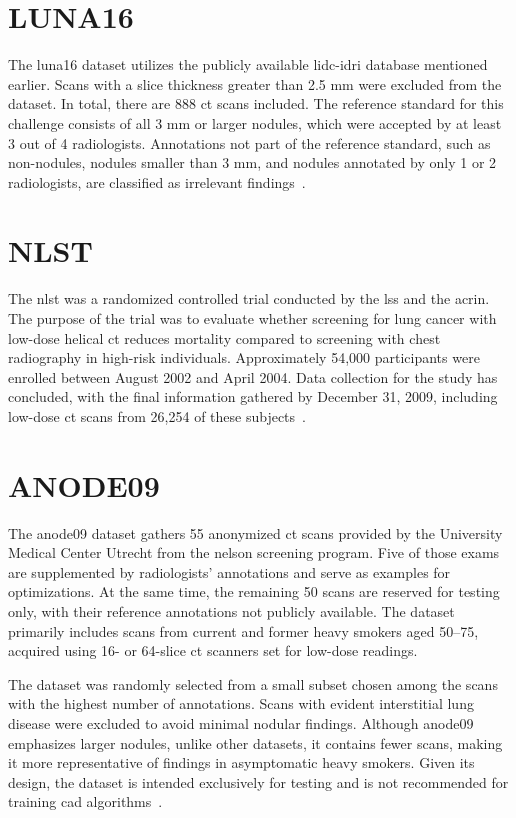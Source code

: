 \section{LUNA16}\label{luna16}
The \acf{luna16} dataset utilizes the publicly available \ac{lidc-idri} database mentioned earlier. Scans with a slice thickness greater than 2.5 mm were excluded from the dataset. In total, there are 888 \ac{ct} scans included. The reference standard for this challenge consists of all 3 mm or larger nodules, which were accepted by at least 3 out of 4 radiologists. Annotations not part of the reference standard, such as non-nodules, nodules smaller than 3 mm, and nodules annotated by only 1 or 2 radiologists, are classified as irrelevant findings~\cite{setio_luna16_2016}.

\section{NLST}\label{nlst}
The \acf{nlst} was a randomized controlled trial conducted by the \ac{lss} and the \ac{acrin}. The purpose of the trial was to evaluate whether screening for lung cancer with low-dose helical \ac{ct} reduces mortality compared to screening with chest radiography in high-risk individuals. 
Approximately 54,000 participants were enrolled between August 2002 and April 2004. Data collection for the study has concluded, with the final information gathered by December 31, 2009, including low-dose \ac{ct} scans from 26,254 of these subjects~\cite{national_lung_screening_trial_research_team_data_2013, national_lung_screening_trial_research_team_reduced_2011}.

\section{ANODE09}\label{anode09}
The \acf{anode09} dataset gathers 55 anonymized \ac{ct} scans provided by the University Medical Center Utrecht from the \ac{nelson} screening program. Five of those exams are supplemented by radiologists' annotations and serve as examples for optimizations. At the same time, the remaining 50 scans are reserved for testing only, with their reference annotations not publicly available. The dataset primarily includes scans from current and former heavy smokers aged 50–75, acquired using 16- or 64-slice \ac{ct} scanners set for low-dose readings.

The dataset was randomly selected from a small subset chosen among the scans with the highest number of annotations. Scans with evident interstitial lung disease were excluded to avoid minimal nodular findings. Although \ac{anode09} emphasizes larger nodules, unlike other datasets, it contains fewer scans, making it more representative of findings in asymptomatic heavy smokers. Given its design, the dataset is intended exclusively for testing and is not recommended for training \ac{cad} algorithms~\cite{ginneken_comparing_2010}.

